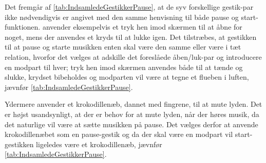 \noindent
%
Det fremgår af \autoref{tab:IndsamledeGestikkerPause}, at de syv forskellige gestik-par ikke nødvendigvis er angivet med den samme henvisning til både pause og start-funktionen. \textcite[s. 48]{PDF:UserDefinedGesturesTV} anvender eksempelvis et tryk hen imod skærmen til at åbne for noget, mens der anvendes et kryds til at lukke igen. Det tilstræbes, at gestikken til at pause og starte musikken enten skal være den samme eller være i tæt relation, hvorfor det vælges at adskille det foreslåede åben/luk-par og introducere en modpart til hver; tryk hen imod skærmen anvendes både til at tænde og slukke, krydset bibeholdes og modparten vil være at tegne et flueben i luften, jævnfør \autoref{tab:IndsamledeGestikkerPause}.   

Ydermere anvender \textcite[s. 48]{PDF:UserDefinedGesturesTV} et krokodillenæb, dannet med fingrene, til at mute lyden. Det er højst usandsynligt, at der er behov for at mute lyden, når der høres musik, da det naturlige vil være at sætte musikken på pause. Det vælges derfor at anvende krokodillenæbet som en pause-gestik og da der skal være en modpart vil start-gestikken ligeledes være et krokodillenæb, jævnfør \autoref{tab:IndsamledeGestikkerPause}. 
%
